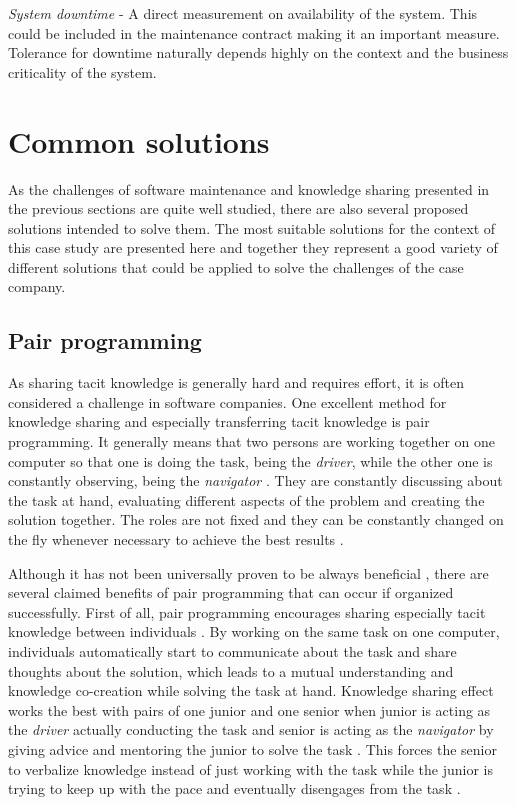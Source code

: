 \emph{System downtime} - A direct measurement on availability of the system. This could be included in the maintenance contract making it an important measure. Tolerance for
downtime naturally depends highly on the context and the business criticality of the system. \citep{Paschke2006}

\section{Common solutions}
\label{section:solutions-theory}

As the challenges of software maintenance and knowledge sharing presented in the previous sections are quite well studied, there are also several proposed solutions intended to solve them.
The most suitable solutions for the context of this case study are presented here and together they represent a good variety of different solutions that could be applied to solve the
challenges of the case company.

\subsection{Pair programming}
\label{section:pair-programming-theory}

As sharing tacit knowledge is generally hard and requires effort, it is often considered a challenge in software companies. One excellent method for knowledge
sharing and especially transferring tacit knowledge is pair programming. It generally means that two persons are working together on one computer so that one is doing the task, being the
\emph{driver}, while the other one is constantly observing, being the \emph{navigator} \citep{Williams2010}\citep{Wray2010}. They are constantly discussing about the task at hand, evaluating different aspects
of the problem and creating the solution together. The roles are not fixed and they can be constantly changed on the fly whenever necessary to achieve the best results \citep{Gupta2013}\citep{Wray2010}.

Although it has not been universally proven to be always beneficial \citep{Maguire2014}, there are several claimed benefits of pair programming that can occur if organized successfully.
First of all, pair programming encourages sharing especially tacit knowledge between individuals \citep{Maguire2014}\citep{Plonka2015}\citep{Williams2010}\citep{Wray2010}\citep{Zieris2014}. By working on 
the same task on one computer, individuals automatically start to communicate about the task and share thoughts about the solution, which leads to a mutual understanding and knowledge
co-creation while solving the task at hand. Knowledge sharing effect works the best with pairs of one junior and one senior when junior is acting as the \emph{driver} actually conducting the
task and senior is acting as the \emph{navigator} by giving advice and mentoring the junior to solve the task \citep{Plonka2012}\citep{Plonka2015}\citep{Sun2009}. This forces the senior to verbalize
knowledge instead of just working with the task while the junior is trying to keep up with the pace and eventually disengages from the task \citep{Plonka2012}\citep{Plonka2015}.

